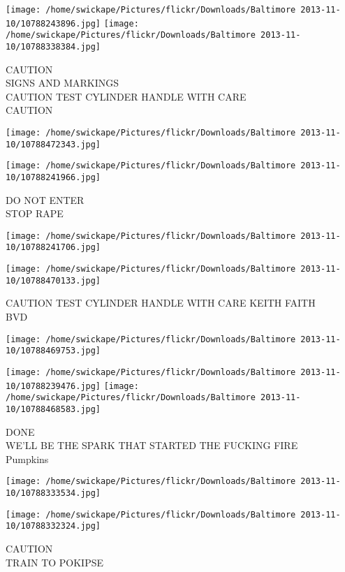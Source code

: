 \documentclass[10pt,letterpaper]{article}
\begin{document}
\texttt{[image: /home/swickape/Pictures/flickr/Downloads/Baltimore 2013-11-10/10788243896.jpg]}
\texttt{[image: /home/swickape/Pictures/flickr/Downloads/Baltimore 2013-11-10/10788338384.jpg]}

CAUTION\\
SIGNS AND MARKINGS\\
CAUTION TEST CYLINDER HANDLE WITH CARE\\
CAUTION
\pagebreak

\texttt{[image: /home/swickape/Pictures/flickr/Downloads/Baltimore 2013-11-10/10788472343.jpg]}

\vspace{0.25in}
\texttt{[image: /home/swickape/Pictures/flickr/Downloads/Baltimore 2013-11-10/10788241966.jpg]}

DO NOT ENTER\\
STOP RAPE
\pagebreak

\texttt{[image: /home/swickape/Pictures/flickr/Downloads/Baltimore 2013-11-10/10788241706.jpg]}

\vspace{0.25in}
\texttt{[image: /home/swickape/Pictures/flickr/Downloads/Baltimore 2013-11-10/10788470133.jpg]}

CAUTION TEST CYLINDER HANDLE WITH CARE KEITH FAITH\\
BVD
\pagebreak

\texttt{[image: /home/swickape/Pictures/flickr/Downloads/Baltimore 2013-11-10/10788469753.jpg]}

\vspace{0.25in}
\texttt{[image: /home/swickape/Pictures/flickr/Downloads/Baltimore 2013-11-10/10788239476.jpg]}
\texttt{[image: /home/swickape/Pictures/flickr/Downloads/Baltimore 2013-11-10/10788468583.jpg]}

DONE\\
WE'LL BE THE SPARK THAT STARTED THE FUCKING FIRE\\
Pumpkins
\pagebreak

\texttt{[image: /home/swickape/Pictures/flickr/Downloads/Baltimore 2013-11-10/10788333534.jpg]}

\vspace{0.25in}
\texttt{[image: /home/swickape/Pictures/flickr/Downloads/Baltimore 2013-11-10/10788332324.jpg]}

CAUTION\\
TRAIN TO POKIPSE
\pagebreak
\end{document}
